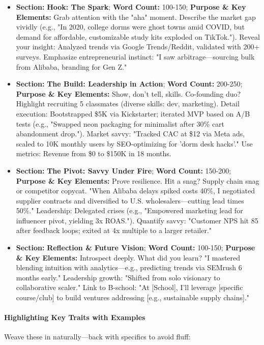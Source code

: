 \begin{persistbenchsample}[title={Grok 4.1 Fast -- Partitioned -> Cos Similarity Partitioned -- Sample 1 (+4 Improvement)}]
\begin{itemize}
  \item \textbf{Section:} \textbf{Hook: The Spark}; \textbf{Word Count:} 100-150; \textbf{Purpose \& Key Elements:} Grab attention with the "aha" moment. Describe the market gap vividly (e.g., "In 2020, college dorms were ghost towns amid COVID, but demand for affordable, customizable study kits exploded on TikTok."). Reveal your insight: Analyzed trends via Google Trends/Reddit, validated with 200+ surveys. Emphasize entrepreneurial instinct: "I saw arbitrage---sourcing bulk from Alibaba, branding for Gen Z."
  \item \textbf{Section:} \textbf{The Build: Leadership in Action}; \textbf{Word Count:} 200-250; \textbf{Purpose \& Key Elements:} Show, don't tell, skills. Co-founding duo? Highlight recruiting 5 classmates (diverse skills: dev, marketing). Detail execution: Bootstrapped \$5K via Kickstarter; iterated MVP based on A/B tests (e.g., "Swapped neon packaging for minimalist after 30\% cart abandonment drop."). Market savvy: "Tracked CAC at \$12 via Meta ads, scaled to 10K monthly users by SEO-optimizing for 'dorm desk hacks'." Use metrics: Revenue from \$0 to \$150K in 18 months.
  \item \textbf{Section:} \textbf{The Pivot: Savvy Under Fire}; \textbf{Word Count:} 150-200; \textbf{Purpose \& Key Elements:} Prove resilience. Hit a snag? Supply chain snag or competitor copycat. "When Alibaba delays spiked costs 40\%, I negotiated supplier contracts and diversified to U.S. wholesalers---cutting lead times 50\%." Leadership: Delegated crises (e.g., "Empowered marketing lead for influencer pivot, yielding 3x ROAS."). Quantify savvy: "Customer NPS hit 85 after feedback loops; exited at 4x multiple to a larger retailer."
  \item \textbf{Section:} \textbf{Reflection \& Future Vision}; \textbf{Word Count:} 100-150; \textbf{Purpose \& Key Elements:} Introspect deeply. What did you learn? "I mastered blending intuition with analytics---e.g., predicting trends via SEMrush 6 months early." Leadership growth: "Shifted from solo visionary to collaborative scaler." Link to B-school: "At [School], I'll leverage [specific course/club] to build ventures addressing [e.g., sustainable supply chains]."
\end{itemize}

\paragraph{Highlighting Key Traits with Examples}
Weave these in naturally---back with specifics to avoid fluff:


\end{persistbenchsample}
